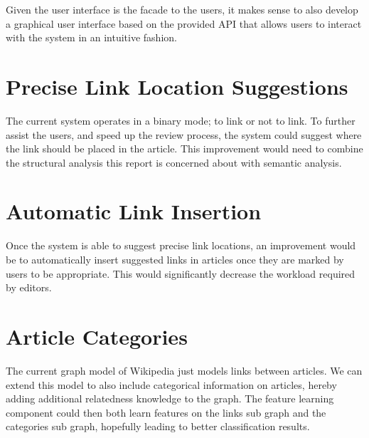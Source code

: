 Given the user interface is the facade to the users, it makes sense to also develop a graphical user interface based on the provided API that allows users to interact with the system in an intuitive fashion.

\section{Precise Link Location Suggestions}
The current system operates in a binary mode; to link or not to link. To further assist the users, and speed up the review process, the system could suggest where the link should be placed in the article. This improvement would need to combine the structural analysis this report is concerned about with semantic analysis.

\section{Automatic Link Insertion}
Once the system is able to suggest precise link locations, an improvement would be to automatically insert suggested links in articles once they are marked by users to be appropriate. This would significantly decrease the workload required by editors.

\section{Article Categories}
The current graph model of Wikipedia just models links between articles. We can extend this model to also include categorical information on articles, hereby adding additional relatedness knowledge to the graph. The feature learning component could then both learn features on the links sub graph and the categories sub graph, hopefully leading to better classification results.